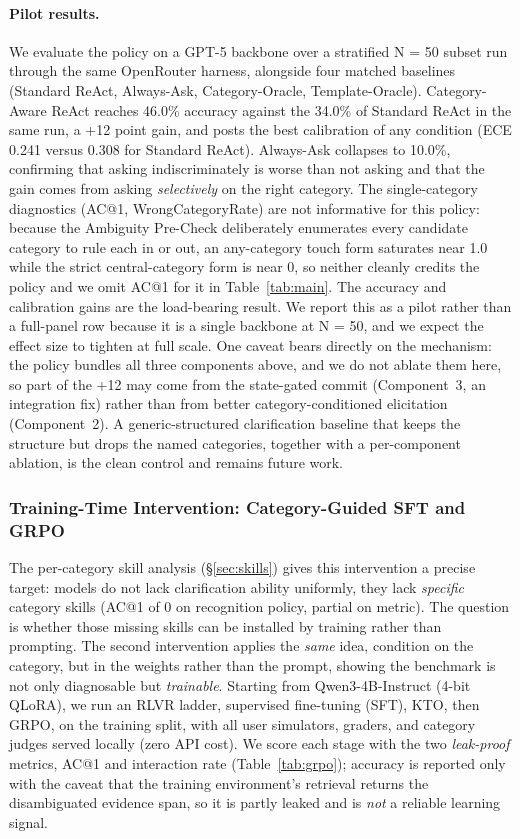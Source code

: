\paragraph{Pilot results.}
We evaluate the policy on a GPT-5 backbone over a stratified N = 50 subset run
through the same OpenRouter harness, alongside four matched baselines (Standard ReAct,
Always-Ask, Category-Oracle, Template-Oracle). Category-Aware ReAct reaches 46.0\% accuracy
against the 34.0\% of Standard ReAct in the same run, a +12 point gain, and posts the
best calibration of any condition (ECE 0.241 versus 0.308 for Standard ReAct). Always-Ask
collapses to 10.0\%, confirming that asking indiscriminately is worse than not asking and
that the gain comes from asking \emph{selectively} on the right category. The single-category
diagnostics (AC@1, WrongCategoryRate) are not informative for this policy: because the
Ambiguity Pre-Check deliberately enumerates every candidate category to rule each in or out, an
any-category touch form saturates near 1.0 while the strict central-category form is near 0, so
neither cleanly credits the policy and we omit AC@1 for it in Table~\ref{tab:main}. The
accuracy and calibration gains are the load-bearing result. We report this as a pilot rather
than a full-panel row because it is a single backbone at N = 50, and we expect the effect
size to tighten at full scale. One caveat bears directly on the mechanism: the policy bundles all
three components above, and we do not ablate them here, so part of the +12 may come from the
state-gated commit (Component~3, an integration fix) rather than from better category-conditioned
elicitation (Component~2). A generic-structured clarification baseline that keeps the structure
but drops the named categories, together with a per-component ablation, is the clean control and
remains future work.

\subsubsection{Training-Time Intervention: Category-Guided SFT and GRPO}
\label{sec:grpo}

The per-category skill analysis (\S\ref{sec:skills}) gives this intervention a precise
target: models do not lack clarification ability uniformly, they lack \emph{specific}
category skills (AC@1 of 0 on recognition policy, partial on metric). The question is
whether those missing skills can be installed by training rather than prompting.
The second intervention applies the \emph{same} idea, condition on the
category, but in the weights rather than the prompt, showing the benchmark is not
only diagnosable but \emph{trainable}. Starting from Qwen3-4B-Instruct (4-bit
QLoRA), we run an RLVR ladder, supervised fine-tuning (SFT), KTO, then GRPO, on
the \fininteract training split, with all user simulators, graders, and category
judges served locally (zero API cost). We score each stage with the two
\emph{leak-proof} metrics, AC@1 and interaction rate (Table~\ref{tab:grpo});
accuracy is reported only with the caveat that the training environment's
retrieval returns the disambiguated evidence span, so it is partly leaked and is
\emph{not} a reliable learning signal.

